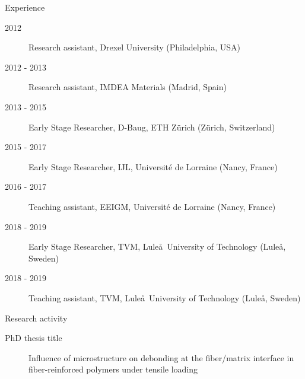 \documentclass{beamer}
\begin{document}
\begin{frame}{Experience}
\small
\begin{description}
  \item[2012] Research assistant, Drexel University (Philadelphia, USA)
  \item[2012 - 2013] Research assistant, IMDEA Materials (Madrid, Spain)
  \item[2013 - 2015] Early Stage Researcher, D-Baug, ETH Z\"urich (Z\"urich, Switzerland)
  \item[2015 - 2017] Early Stage Researcher, IJL, Universit\'e de Lorraine (Nancy, France)
  \item[2016 - 2017] Teaching assistant, EEIGM, Universit\'e de Lorraine (Nancy, France)
  \item[2018 - 2019] Early Stage Researcher, TVM, Lule\aa\ University of Technology (Lule\aa, Sweden)
  \item[2018 - 2019] Teaching assistant, TVM, Lule\aa\ University of Technology (Lule\aa, Sweden)
\end{description}
\end{frame}

\begin{frame}{Research activity}
\small
\begin{description}
  \item[PhD thesis title] Influence of microstructure on debonding at the fiber/matrix interface in fiber-reinforced polymers under tensile loading
\end{description}
\end{frame}
\end{document}
